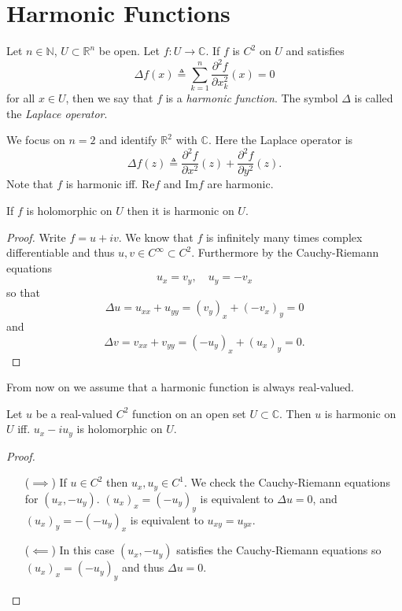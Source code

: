 \section{Harmonic Functions}

\begin{defn}
Let $n \in \mathbb{N}$, $U \subset \mathbb{R}^n$ be open.
Let $f : U \to \mathbb{C}$. If $f$ is $C^2$ on $U$ and
satisfies
$$
           \Delta f(x)
\triangleq \sum_{k=1}^n \frac{\partial^2 f}{\partial x_k^2}(x) = 0
$$
for all $x \in U$, then we say that $f$ is a \emph{harmonic function}.
The symbol $\Delta$ is called the \emph{Laplace operator}.
\end{defn}

We focus on $n = 2$ and identify $\mathbb{R}^2$ with $\mathbb{C}$.
Here the Laplace operator is
$$
\Delta f(z)
\triangleq
  \frac{\partial^2 f}{\partial x^2}(z)
+ \frac{\partial^2 f}{\partial y^2}(z).
$$
Note that $f$ is harmonic iff. $\mathrm{Re} f$ and
$\mathrm{Im} f$ are harmonic.

\begin{theorem}
If $f$ is holomorphic on $U$ then it is harmonic on $U$.
\end{theorem}
\begin{proof}
Write $f = u + iv$. We know that $f$ is infinitely many times
complex differentiable and thus $u, v \in C^\infty \subset C^2$.
Furthermore by the Cauchy-Riemann equations
$$
u_x = v_y, \quad u_y = -v_x
$$
so that
$$
\Delta u = u_{xx} + u_{yy} = (v_y)_x + (-v_x)_y = 0
$$
and
$$
\Delta v = v_{xx} + v_{yy} = (-u_y)_x + (u_x)_y = 0.
$$
\end{proof}

From now on we assume that a harmonic function is
always real-valued.

\begin{lemma}
Let $u$ be a real-valued $C^2$ function on an open set
$U \subset \mathbb{C}$. Then $u$ is harmonic on $U$ iff.
$u_x - i u_y$ is holomorphic on $U$.
\end{lemma}

\begin{proof}
\begin{itemize}
  \item[($\implies$)]{
    If $u \in C^2$ then $u_x, u_y \in C^1$. We check the
    Cauchy-Riemann equations for $(u_x, -u_y)$.
    $(u_x)_x = (-u_y)_y$ is equivalent to $\Delta u = 0$,
    and $(u_x)_y = -(-u_y)_x$ is equivalent to $u_{xy} = u_{yx}$.
  }
  \item[($\impliedby$)]{
    In this case $(u_x, -u_y)$ satisfies the Cauchy-Riemann equations
    so $(u_x)_x = (-u_y)_y$ and thus $\Delta u = 0$.
  }
\end{itemize}
\end{proof}

